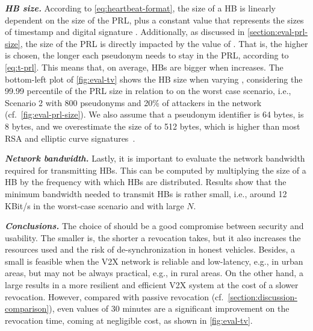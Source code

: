 \noindent\textbf{\emph{\ac{HB} size.}}
%
According to \cref{eq:heartbeat-format}, the size of a \ac{HB} is linearly
dependent on the size of the \ac{PRL}, plus a constant value that represents the
sizes of timestamp \paramthb{} and digital signature \funcsignature{}.
Additionally, as discussed in \cref{section:eval-prl-size}, the size of the
\ac{PRL} is directly impacted by the value of \paramtt{}. That is, the higher
\paramtt{} is chosen, the longer each pseudonym needs to stay in the \ac{PRL},
according to \cref{eq:t-prl}. This means that, on average, \acp{HB} are bigger
when \paramtt{} increases. The bottom-left plot of \cref{fig:eval-tv} shows the
\ac{HB} size when varying \paramtt{}, considering the 99.99 percentile of the
\ac{PRL} size in relation to \paramtt{} on the worst case scenario, i.e.,
Scenario 2 with 800 pseudonyms and 20\% of attackers in the network
(cf.~\cref{fig:eval-prl-size}). We also assume that a pseudonym identifier is 64
bytes, \paramthb{} is 8 bytes, and we overestimate the size of \funcsignature{}
to 512 bytes, which is higher than most RSA and elliptic curve
signatures~\cite{nistDSS}.

\noindent\textbf{\emph{Network bandwidth.}}
%
Lastly, it is important to evaluate the network bandwidth required for
transmitting \acp{HB}. This can be computed by multiplying the size of a \ac{HB}
by the frequency with which \acp{HB} are distributed. Results show that the
minimum bandwidth needed to transmit \acp{HB} is rather small, i.e., around 12
KBit/s in the worst-case scenario and with large $N$.

\noindent\textbf{\emph{Conclusions.}}
%
The choice of \paramtt{} should be a good compromise between security and
usability. The smaller \paramtt{} is, the shorter a revocation takes, but it
also increases the resources used and the risk of de-synchronization in honest
vehicles. Besides, a small \paramtt{} is feasible when the \ac{V2X} network is
reliable and low-latency, e.g., in urban areas, but may not be always practical,
e.g., in rural areas. On the other hand, a large \paramtt{} results in a more
resilient and efficient \ac{V2X} system at the cost of a slower revocation.
However, compared with passive revocation
(cf.~\cref{section:discussion-comparison}), even \paramteff{} values of 30
minutes are a significant improvement on the revocation time, coming at
negligible cost, as shown in \cref{fig:eval-tv}.
